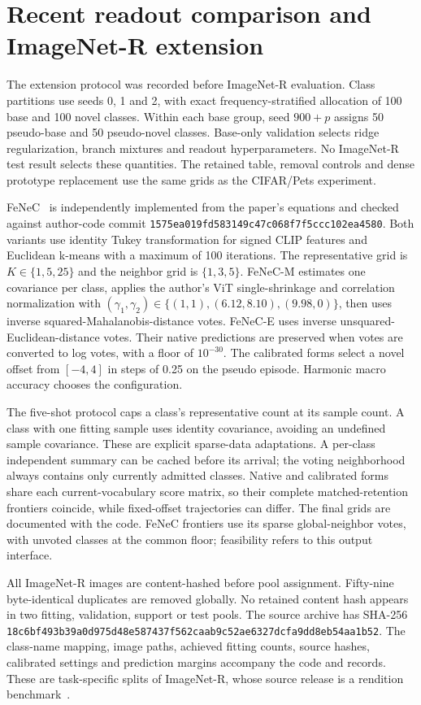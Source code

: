 \documentclass[preprint,review,12pt]{elsarticle}
\begin{document}
\FloatBarrier
\section{Recent readout comparison and ImageNet-R extension}
The extension protocol was recorded before ImageNet-R evaluation. Class partitions use seeds 0, 1 and 2, with exact frequency-stratified allocation of 100 base and 100 novel classes. Within each base group, seed $900+p$ assigns 50 pseudo-base and 50 pseudo-novel classes. Base-only validation selects ridge regularization, branch mixtures and readout hyperparameters. No ImageNet-R test result selects these quantities. The retained table, removal controls and dense prototype replacement use the same grids as the CIFAR/Pets experiment.

FeNeC~\cite{ksiazek2026fenec} is independently implemented from the paper's equations and checked against author-code commit \nolinkurl{1575ea019fd583149c47c068f7f5ccc102ea4580}. Both variants use identity Tukey transformation for signed CLIP features and Euclidean k-means with a maximum of 100 iterations. The representative grid is $K\in\{1,5,25\}$ and the neighbor grid is $\{1,3,5\}$. FeNeC-M estimates one covariance per class, applies the author's ViT single-shrinkage and correlation normalization with $(\gamma_1,\gamma_2)\in\{(1,1),(6.12,8.10),(9.98,0)\}$, then uses inverse squared-Mahalanobis-distance votes. FeNeC-E uses inverse unsquared-Euclidean-distance votes. Their native predictions are preserved when votes are converted to log votes, with a floor of $10^{-30}$. The calibrated forms select a novel offset from $[-4,4]$ in steps of 0.25 on the pseudo episode. Harmonic macro accuracy chooses the configuration.

The five-shot protocol caps a class's representative count at its sample count. A class with one fitting sample uses identity covariance, avoiding an undefined sample covariance. These are explicit sparse-data adaptations. A per-class independent summary can be cached before its arrival; the voting neighborhood always contains only currently admitted classes. Native and calibrated forms share each current-vocabulary score matrix, so their complete matched-retention frontiers coincide, while fixed-offset trajectories can differ. The final grids are documented with the code. FeNeC frontiers use its sparse global-neighbor votes, with unvoted classes at the common floor; feasibility refers to this output interface.

All ImageNet-R images are content-hashed before pool assignment. Fifty-nine byte-identical duplicates are removed globally. No retained content hash appears in two fitting, validation, support or test pools. The source archive has SHA-256 \nolinkurl{18c6bf493b39a0d975d48e587437f562caab9c52ae6327dcfa9dd8eb54aa1b52}. The class-name mapping, image paths, achieved fitting counts, source hashes, calibrated settings and prediction margins accompany the code and records. These are task-specific splits of ImageNet-R, whose source release is a rendition benchmark~\cite{hendrycks2021manyfaces}.
\end{document}
